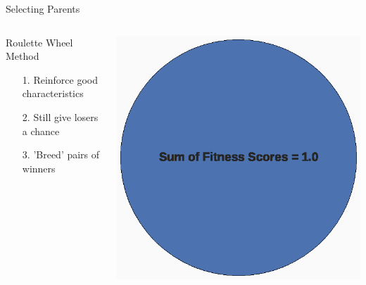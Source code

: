 \documentclass[10pt]{beamer}
\begin{document}
{{%
\begin{frame}{Selecting Parents}
	\begin{columns}[c] %
		\begin{column}{.48\textwidth}
			\begin{block}{Roulette Wheel Method}
    			\begin{itemize}[<+->]
    				\item[1.] {Reinforce good characteristics}
    				\item[2.] {Still give losers a chance}
    				\item[3.] {'Breed' pairs of winners}
    			\end{itemize}
			\end{block}
		\end{column}
		\hfill
		\begin{column}{0.48\textwidth}
		    \begin{overprint}
			    \includegraphics[width=\linewidth]{images/pie0.eps}

\end{overprint}
\end{column}
\end{columns}
\end{frame}}}
\end{document}
